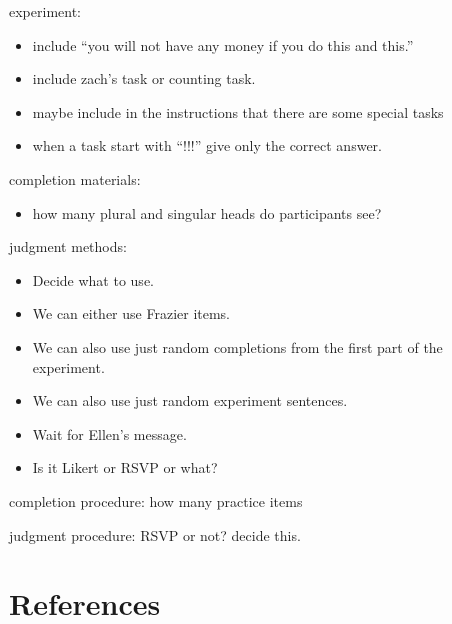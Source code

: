 \documentclass[
  10pt,
  letterpaper,
  DIV=11,
  numbers=noendperiod]{scrartcl}
\providecommand{\tightlist}{%
  \setlength{\itemsep}{0pt}\setlength{\parskip}{0pt}}\usepackage{longtable,booktabs,array}
\begin{document}
\begin{tcolorbox}[enhanced jigsaw, bottomrule=.15mm, breakable, toprule=.15mm, coltitle=black, titlerule=0mm, opacityback=0, colframe=quarto-callout-important-color-frame, arc=.35mm, bottomtitle=1mm, toptitle=1mm, title=\textcolor{quarto-callout-important-color}{\faExclamation}\hspace{0.5em}{To-dos}, left=2mm, leftrule=.75mm, colbacktitle=quarto-callout-important-color!10!white, rightrule=.15mm, colback=white, opacitybacktitle=0.6]

experiment:

\begin{itemize}
\tightlist
\item
  include ``you will not have any money if you do this and this.''
\item
  include zach's task or counting task.
\item
  maybe include in the instructions that there are some special tasks
\item
  when a task start with ``!!!'' give only the correct answer.
\end{itemize}

completion materials:

\begin{itemize}
\tightlist
\item
  how many plural and singular heads do participants see?
\end{itemize}

judgment methods:

\begin{itemize}
\tightlist
\item
  Decide what to use.
\item
  We can either use Frazier items.
\item
  We can also use just random completions from the first part of the
  experiment.
\item
  We can also use just random experiment sentences.
\item
  Wait for Ellen's message.
\item
  Is it Likert or RSVP or what?
\end{itemize}

completion procedure: how many practice items

judgment procedure: RSVP or not? decide this.

\end{tcolorbox}

\hypertarget{references}{%
\section{References}\label{references}}
\end{document}
